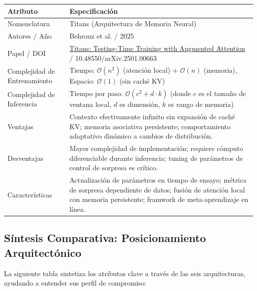 \documentclass[11pt,a4paper]{article}
\begin{document}
\begin{center}
\begin{tabular}{|l|p{11cm}|}
\hline
\textbf{Atributo} & \textbf{Especificación} \\
\hline
Nomenclatura & Titans (Arquitectura de Memoria Neural) \\
\hline
Autores / Año & Behrouz et al. / 2025 \\
\hline
Papel / DOI & \href{https://arxiv.org/abs/2501.00663}{Titans: Testing-Time Training with Augmented Attention} / 10.48550/arXiv.2501.00663 \\
\hline
Complejidad de Entrenamiento & Tiempo: $\mathcal{O}(n^2)$ (atención local) + $\mathcal{O}(n)$ (memoria), Espacio: $\mathcal{O}(1)$ (sin caché KV) \\
\hline
Complejidad de Inferencia & Tiempo por paso: $\mathcal{O}(c^2 + d \cdot k)$ (donde $c$ es el tamaño de ventana local, $d$ es dimensión, $k$ es rango de memoria) \\
\hline
Ventajas & Contexto efectivamente infinito sin expansión de caché KV; memoria asociativa persistente; comportamiento adaptativo dinámico a cambios de distribución. \\
\hline
Desventajas & Mayor complejidad de implementación; requiere cómputo diferenciable durante inferencia; tuning de parámetros de control de sorpresa es crítico. \\
\hline
Características & Actualización de parámetros en tiempo de ensayo; métrica de sorpresa dependiente de datos; fusión de atención local con memoria persistente; framwork de meta-aprendizaje en línea. \\
\hline
\end{tabular}
\end{center}

\subsection{Síntesis Comparativa: Posicionamiento Arquitectónico}

La siguiente tabla sintetiza los atributos clave a través de las seis arquitecturas, ayudando a entender sus perfil de compromiso:
\end{document}

